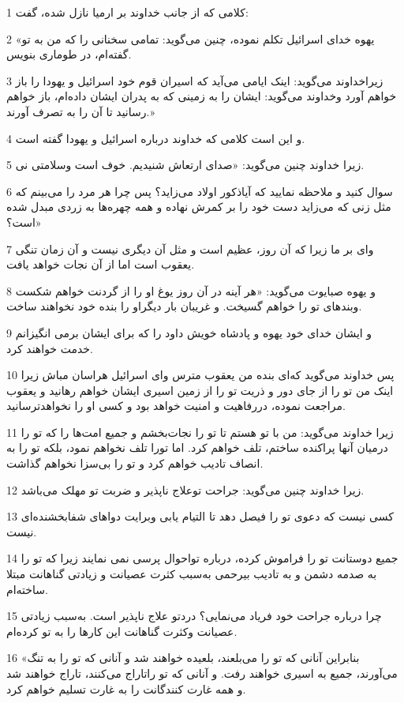 \par 1 کلامی که از جانب خداوند بر ارمیا نازل شده، گفت:
\par 2 «یهوه خدای اسرائیل تکلم نموده، چنین می‌گوید: تمامی سخنانی را که من به تو گفته‌ام، در طوماری بنویس.
\par 3 زیراخداوند می‌گوید: اینک ایامی می‌آید که اسیران قوم خود اسرائیل و یهودا را باز خواهم آورد وخداوند می‌گوید: ایشان را به زمینی که به پدران ایشان داده‌ام، باز خواهم رسانید تا آن را به تصرف آورند.»
\par 4 و این است کلامی که خداوند درباره اسرائیل و یهودا گفته است.
\par 5 زیرا خداوند چنین می‌گوید: «صدای ارتعاش شنیدیم. خوف است وسلامتی نی.
\par 6 سوال کنید و ملاحظه نمایید که آیاذکور اولاد می‌زاید؟ پس چرا هر مرد را می‌بینم که مثل زنی که می‌زاید دست خود را بر کمرش نهاده و همه چهره‌ها به زردی مبدل شده است؟»
\par 7 وای بر ما زیرا که آن روز، عظیم است و مثل آن دیگری نیست و آن زمان تنگی یعقوب است اما از آن نجات خواهد یافت.
\par 8 و یهوه صبایوت می‌گوید: «هر آینه در آن روز یوغ او را از گردنت خواهم شکست وبندهای تو را خواهم گسیخت. و غریبان بار دیگراو را بنده خود نخواهند ساخت.
\par 9 و ایشان خدای خود یهوه و پادشاه خویش داود را که برای ایشان برمی انگیزانم خدمت خواهند کرد.
\par 10 پس خداوند می‌گوید که‌ای بنده من یعقوب مترس وای اسرائیل هراسان مباش زیرا اینک من تو را از جای دور و ذریت تو را از زمین اسیری ایشان خواهم رهانید و یعقوب مراجعت نموده، دررفاهیت و امنیت خواهد بود و کسی او را نخواهدترسانید.
\par 11 زیرا خداوند می‌گوید: من با تو هستم تا تو را نجات‌بخشم و جمیع امت‌ها را که تو را درمیان آنها پراکنده ساختم، تلف خواهم کرد. اما تورا تلف نخواهم نمود، بلکه تو را به انصاف تادیب خواهم کرد و تو را بی‌سزا نخواهم گذاشت.
\par 12 زیرا خداوند چنین می‌گوید: جراحت توعلاج ناپذیر و ضربت تو مهلک می‌باشد.
\par 13 کسی نیست که دعوی تو را فیصل دهد تا التیام یابی وبرایت دواهای شفابخشنده‌ای نیست.
\par 14 جمیع دوستانت تو را فراموش کرده، درباره تواحوال پرسی نمی نمایند زیرا که تو را به صدمه دشمن و به تادیب بیرحمی به‌سبب کثرت عصیانت و زیادتی گناهانت مبتلا ساخته‌ام.
\par 15 چرا درباره جراحت خود فریاد می‌نمایی؟ دردتو علاج ناپذیر است. به‌سبب زیادتی عصیانت وکثرت گناهانت این کارها را به تو کرده‌ام.
\par 16 «بنابراین آنانی که تو را می‌بلعند، بلعیده خواهند شد و آنانی که تو را به تنگ می‌آورند، جمیع به اسیری خواهند رفت. و آنانی که تو راتاراج می‌کنند، تاراج خواهند شد و همه غارت کنندگانت را به غارت تسلیم خواهم کرد.
